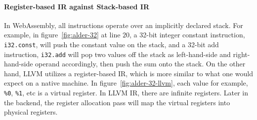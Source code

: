 
\paragraph{Register-based IR against Stack-based IR}
In WebAssembly, all instructions operate over an implicitly declared stack. For
example, in figure~\ref{fig:alder-32} at line $20$, a 32-bit integer constant 
instruction, \texttt{i32.const}, will push the constant value on the stack, and
a 32-bit add instruction, \texttt{i32.add} will pop two values off the stack as
left-hand-side and right-hand-side operand accordingly, then push the sum onto
the stack. On the other hand, LLVM utilizes a register-based IR, which is more
similar to what one would expect on a native machine. In 
figure~\ref{fig:alder-32-llvm}, each value for example, \texttt{\%0},
\texttt{\%1}, etc is a virtual register. In LLVM IR, there are infinite
registers. Later in the backend, the register allocation pass will map
the virtual registers into physical registers. 

